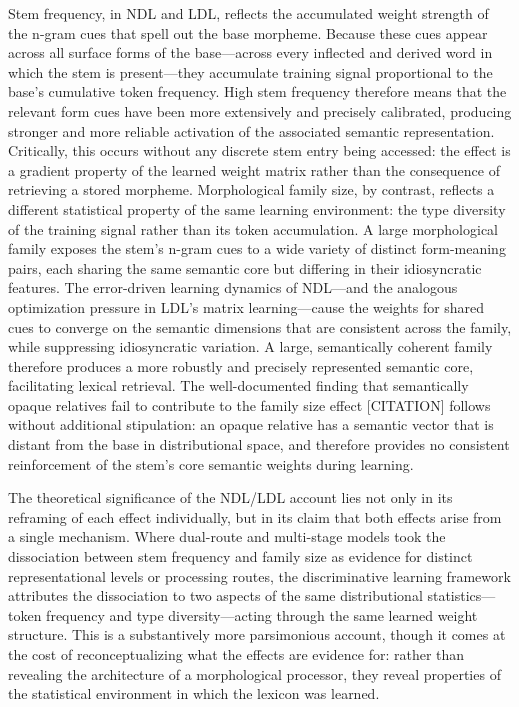 \documentclass[utf8]{FrontiersinHarvard} %
\begin{document}
Stem frequency, in NDL and LDL, reflects the accumulated weight strength of the n-gram cues that spell out the base morpheme. Because these cues appear across all surface forms of the base—across every inflected and derived word in which the stem is present—they accumulate training signal proportional to the base's cumulative token frequency. High stem frequency therefore means that the relevant form cues have been more extensively and precisely calibrated, producing stronger and more reliable activation of the associated semantic representation. Critically, this occurs without any discrete stem entry being accessed: the effect is a gradient property of the learned weight matrix rather than the consequence of retrieving a stored morpheme. Morphological family size, by contrast, reflects a different statistical property of the same learning environment: the type diversity of the training signal rather than its token accumulation. A large morphological family exposes the stem's n-gram cues to a wide variety of distinct form-meaning pairs, each sharing the same semantic core but differing in their idiosyncratic features. The error-driven learning dynamics of NDL—and the analogous optimization pressure in LDL's matrix learning—cause the weights for shared cues to converge on the semantic dimensions that are consistent across the family, while suppressing idiosyncratic variation. A large, semantically coherent family therefore produces a more robustly and precisely represented semantic core, facilitating lexical retrieval. The well-documented finding that semantically opaque relatives fail to contribute to the family size effect [CITATION] follows without additional stipulation: an opaque relative has a semantic vector that is distant from the base in distributional space, and therefore provides no consistent reinforcement of the stem's core semantic weights during learning.

The theoretical significance of the NDL/LDL account lies not only in its reframing of each effect individually, but in its claim that both effects arise from a single mechanism. Where dual-route and multi-stage models took the dissociation between stem frequency and family size as evidence for distinct representational levels or processing routes, the discriminative learning framework attributes the dissociation to two aspects of the same distributional statistics—token frequency and type diversity—acting through the same learned weight structure. This is a substantively more parsimonious account, though it comes at the cost of reconceptualizing what the effects are evidence for: rather than revealing the architecture of a morphological processor, they reveal properties of the statistical environment in which the lexicon was learned.
\end{document}
